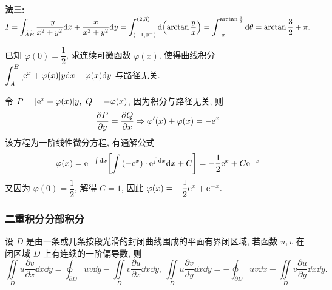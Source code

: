 \begin{solution}
\begin{minipage}{0.35\linewidth}
\begin{figure}[H]
            \caption{}
        \end{figure}
    \end{minipage}
    \textbf{法三: }$\displaystyle I=\int_{\stackrel\frown{AB}}\dfrac{-y}{x^2+y^2}\dd x+\dfrac{x}{x^2+y^2}\dd y=\int_{(-1,0^-)}^{(2,3)}\dd \qty(\arctan\dfrac{y}{x})=\int_{-\pi}^{\arctan\frac{3}{2}}\dd \theta=\arctan\dfrac{3}{2}+\pi.$\\
\end{solution}

\begin{example}
    已知 $\varphi(0)=\dfrac{1}{2}$, 求连续可微函数 $\varphi(x)$, 使得曲线积分 $\displaystyle\int_{A}^{B}\qty[\mathrm{e}^x+\varphi(x)]y\dd x-\varphi(x)\dd y$ 与路径无关.
\end{example}
\begin{solution}
    令 $P=\qty[\mathrm{e}^x+\varphi(x)]y,~Q=-\varphi(x)$, 因为积分与路径无关, 则 $$\pdv{P}{y}=\pdv{Q}{x}\Rightarrow \varphi'(x)+\varphi(x)=-\mathrm{e}^x$$
    该方程为一阶线性微分方程, 有通解公式 $$\varphi(x)=\mathrm{e}^{-\int\dd x}\qty[\int\qty(-\mathrm{e}^{x})\cdot\mathrm{e}^{\int\dd x}\dd x+C]=-\dfrac{1}{2}\mathrm{e}^{x}+C\mathrm{e}^{-x}$$
    又因为 $\varphi(0)=\dfrac{1}{2}$, 解得 $C=1$, 因此 $\varphi(x)=-\dfrac{1}{2}\mathrm{e}^x+\mathrm{e}^{-x}.$
\end{solution}

\subsubsection{二重积分分部积分}

\begin{theorem}[二重积分分部积分公式]
    设 $D$ 是由一条或几条按段光滑的封闭曲线围成的平面有界闭区域, 若函数  $u,v$ 在闭区域 $D$ 上有连续的一阶偏导数, 则
    \label{iintlimitsduvxxy}
    $$\iint\limits _{D}u\dfrac{\partial v}{\partial x}\dd x\dd y=\oint _{\partial D}uv\dd y-\iint\limits _{D}v\dfrac{\partial u}{\partial x}\dd x\dd y,~\iint\limits _{D}u\dfrac{\partial v}{dy}\dd x\dd y=-\oint _{\partial D}uv\dd x-\iint\limits _{D}v\dfrac{\partial u}{\partial y}\dd x\dd y.$$
\end{theorem}


